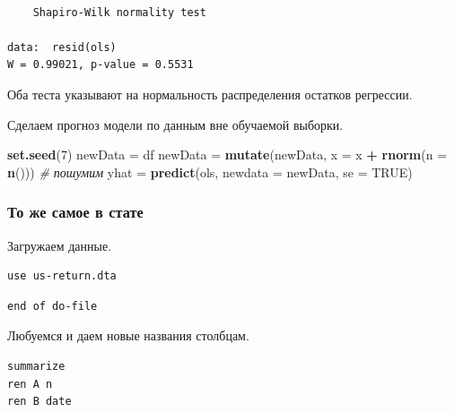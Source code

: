 \documentclass[]{book}
\newenvironment{Shaded}{\begin{snugshade}}{\end{snugshade}}
\newcommand{\CommentTok}[1]{\textcolor[rgb]{0.56,0.35,0.01}{\textit{#1}}}
\newcommand{\DataTypeTok}[1]{\textcolor[rgb]{0.13,0.29,0.53}{#1}}
\newcommand{\DecValTok}[1]{\textcolor[rgb]{0.00,0.00,0.81}{#1}}
\newcommand{\KeywordTok}[1]{\textcolor[rgb]{0.13,0.29,0.53}{\textbf{#1}}}
\newcommand{\NormalTok}[1]{#1}
\newcommand{\OperatorTok}[1]{\textcolor[rgb]{0.81,0.36,0.00}{\textbf{#1}}}
\newcommand{\OtherTok}[1]{\textcolor[rgb]{0.56,0.35,0.01}{#1}}
\newcommand{\StringTok}[1]{\textcolor[rgb]{0.31,0.60,0.02}{#1}}
\begin{document}
\begin{verbatim}

    Shapiro-Wilk normality test

data:  resid(ols)
W = 0.99021, p-value = 0.5531
\end{verbatim}

Оба теста указывают на нормальность распределения остатков регрессии.

Сделаем прогноз модели по данным вне обучаемой выборки.

\begin{Shaded}
\begin{Highlighting}[]
\KeywordTok{set.seed}\NormalTok{(}\DecValTok{7}\NormalTok{)}
\NormalTok{newData =}\StringTok{ }\NormalTok{df}
\NormalTok{newData =}\StringTok{ }\KeywordTok{mutate}\NormalTok{(newData, }\DataTypeTok{x =}\NormalTok{ x }\OperatorTok{+}\StringTok{ }\KeywordTok{rnorm}\NormalTok{(}\DataTypeTok{n =} \KeywordTok{n}\NormalTok{())) }\CommentTok{# пошумим}
\NormalTok{yhat =}\StringTok{ }\KeywordTok{predict}\NormalTok{(ols, }\DataTypeTok{newdata =}\NormalTok{ newData, }\DataTypeTok{se =} \OtherTok{TRUE}\NormalTok{)}
\end{Highlighting}
\end{Shaded}

\hypertarget{----}{%
\subsubsection{То же самое в стате}\label{----}}

Загружаем данные.

\begin{verbatim}
use us-return.dta
\end{verbatim}

\begin{verbatim}
end of do-file
\end{verbatim}

Любуемся и даем новые названия столбцам.

\begin{verbatim}
summarize
ren A n
ren B date
\end{verbatim}
\end{document}
